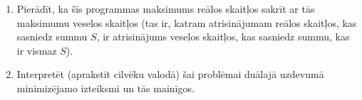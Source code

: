 \documentclass[a4paper,12pt]{article}
\begin{document}
\begin{enumerate}[label=(\alph*)]
\item
Pierādīt, ka šīs programmas maksimums reālos skaitļos sakrīt ar tās 
maksimumu veselos skaitļos (tas ir, katram atrisinājumam reālos skaitļos, 
kas sasniedz summu $S$, ir atrisinājums veselos skaitļos, kas sasniedz summu,
kas ir vismaz $S$).
\item
Interpretēt (aprakstīt cilvēku valodā) šai problēmai duālajā uzdevumā 
minimizējamo izteiksmi un tās mainīgos.
\end{enumerate}
\end{document}
